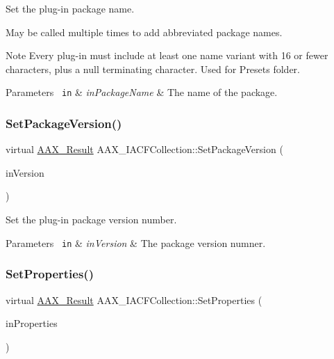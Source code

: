 Set the plug-\/in package name. 

May be called multiple times to add abbreviated package names.

\begin{DoxyNote}{Note}
Every plug-\/in must include at least one name variant with 16 or fewer characters, plus a null terminating character. Used for Presets folder.
\end{DoxyNote}

\begin{DoxyParams}[1]{Parameters}
\mbox{\texttt{ in}}  & {\em in\+Package\+Name} & The name of the package. \\
\hline
\end{DoxyParams}
\mbox{\label{a01621_a4276dc11c5036797a75a66fd49e12839}} 
\subsubsection{\texorpdfstring{SetPackageVersion()}{SetPackageVersion()}}
{\footnotesize\ttfamily virtual \mbox{\hyperlink{a00392_a4d8f69a697df7f70c3a8e9b8ee130d2f}{A\+A\+X\+\_\+\+Result}} A\+A\+X\+\_\+\+I\+A\+C\+F\+Collection\+::\+Set\+Package\+Version (\begin{DoxyParamCaption}\item[{uint32\+\_\+t}]{in\+Version }\end{DoxyParamCaption})\hspace{0.3cm}{\ttfamily [pure virtual]}}



Set the plug-\/in package version number. 


\begin{DoxyParams}[1]{Parameters}
\mbox{\texttt{ in}}  & {\em in\+Version} & The package version numner. \\
\hline
\end{DoxyParams}
\mbox{\label{a01621_a413165097cbab9087294a694d52cf12a}} 
\subsubsection{\texorpdfstring{SetProperties()}{SetProperties()}}
{\footnotesize\ttfamily virtual \mbox{\hyperlink{a00392_a4d8f69a697df7f70c3a8e9b8ee130d2f}{A\+A\+X\+\_\+\+Result}} A\+A\+X\+\_\+\+I\+A\+C\+F\+Collection\+::\+Set\+Properties (\begin{DoxyParamCaption}\item[{\mbox{\hyperlink{a01409}{I\+A\+C\+F\+Unknown}} $\ast$}]{in\+Properties }\end{DoxyParamCaption})\hspace{0.3cm}{\ttfamily [pure virtual]}}



